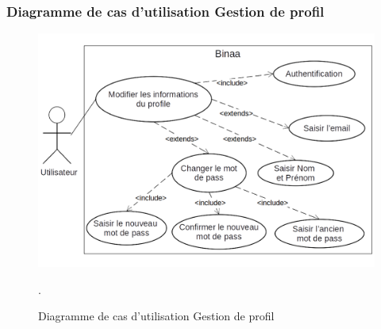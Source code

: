 \subsubsection{Diagramme de cas d’utilisation Gestion de profil}
\begin{figure}[H]
\centering
\includegraphics[scale=0.4]{images/use case/user crud.png}
\caption{Diagramme de cas d’utilisation Gestion de profil}.
\label{fig:my_label}
\end{figure}
